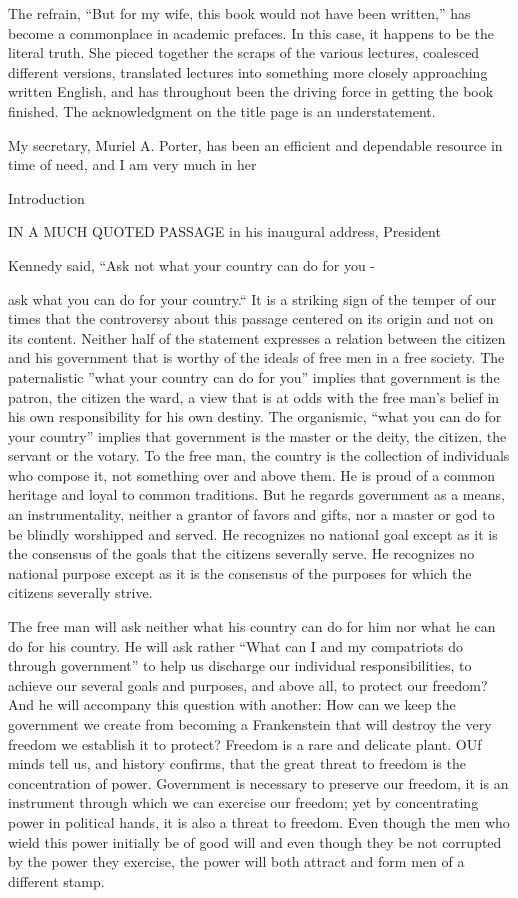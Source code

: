\documentclass[11pt,openany]{book}
\begin{document}
The refrain, ``But for my wife, this book would not have been written,'' has become a commonplace in academic prefaces. In this case, it happens to be the literal truth. She pieced together the scraps of the various lectures, coalesced different versions, translated lectures into something more closely approaching written English, and has throughout been the driving force in getting the book finished. The acknowledgment on the title page is an understatement.

My secretary, Muriel A. Porter, has been an efficient and dependable resource in time of need, and I am very much in her

Introduction

IN A MUCH QUOTED PASSAGE in his inaugural address, President

Kennedy said, ``Ask not what your country can do for you -

ask what you can do for your country.`` It is a striking sign of the temper of our times that the controversy about this passage centered on its origin and not on its content. Neither half of the statement expresses a relation between the citizen and his government that is worthy of the ideals of free men in a free society. The paternalistic ''what your country can do for you'' implies that government is the patron, the citizen the ward, a view that is at odds with the free man's belief in his own responsibility for his own destiny. The organismic, ``what you can do for your country'' implies that government is the master or the deity, the citizen, the servant or the votary. To the free man, the country is the collection of individuals who compose it, not something over and above them. He is proud of a common heritage and loyal to common traditions. But he regards government as a means, an instrumentality, neither a grantor of favors and gifts, nor a master or god to be blindly worshipped and served. He recognizes no national goal except as it is the consensus of the goals that the citizens severally serve. He recognizes no national purpose except as it is the consensus of the purposes for which the citizens severally strive.

The free man will ask neither what his country can do for him nor what he can do for his country. He will ask rather ``What can I and my compatriots do through government'' to help us discharge our individual responsibilities, to achieve our several goals and purposes, and above all, to protect our freedom? And he will accompany this question with another: How can we keep the government we create from becoming a Frankenstein that will destroy the very freedom we establish it to protect? Freedom is a rare and delicate plant. OUf minds tell us, and history confirms, that the great threat to freedom is the concentration of power. Government is necessary to preserve our freedom, it is an instrument through which we can exercise our freedom; yet by concentrating power in political hands, it is also a threat to freedom. Even though the men who wield this power initially be of good will and even though they be not corrupted by the power they exercise, the power will both attract and form men of a different stamp.
\end{document}
